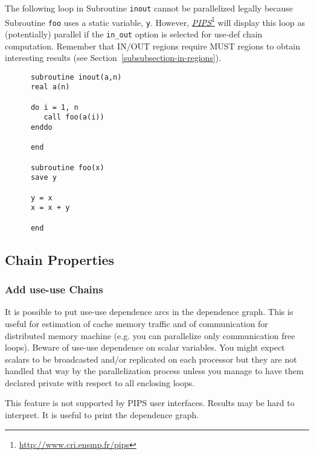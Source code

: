 \documentclass[a4paper]{report}
\newcommand{\LINK}[2]{\href{#2}{#1}\footnote{\url{#2}}\xspace}
\newcommand{\PIPS}{\LINK{\emph{PIPS}}{http://www.cri.ensmp.fr/pips}}
\begin{document}
The following loop in Subroutine \verb+inout+ cannot be parallelized legally
because Subroutine \verb+foo+ uses a static variable, \verb+y+. However,
\PIPS{} will display this loop as (potentially) parallel if the
\verb+in_out+ option is selected for use-def chain computation. Remember
that IN/OUT regions require MUST regions to obtain interesting results
(see Section~\ref{subsubsection-in-regions}).

\noindent
\verb!      subroutine inout(a,n)!\\
\verb!      real a(n)!\\
\verb!      !\\
\verb!      do i = 1, n!\\
\verb!         call foo(a(i))!\\
\verb!      enddo!\\
\verb!      !\\
\verb!      end!\\
\verb!      !\\
\verb!      subroutine foo(x)!\\
\verb!      save y!\\
\verb!      !\\
\verb!      y = x!\\
\verb!      x = x + y!\\
\verb!      !\\
\verb!      end!\\


\subsection{Chain Properties}

\subsubsection{Add use-use Chains}

It is possible to put use-use dependence arcs in the dependence graph.
This is useful for estimation of cache memory traffic and of
communication for distributed memory machine (e.g. you can parallelize
only communication free loops). Beware of use-use dependence on scalar
variables. You might expect scalars to be broadcasted and/or replicated
on each processor but they are not handled that way by the
parallelization process unless you manage to have them
declared private with respect to all enclosing loops.

This feature is not supported by PIPS user interfaces. Results may be
hard to interpret. It is useful to print the dependence graph.
\end{document}

